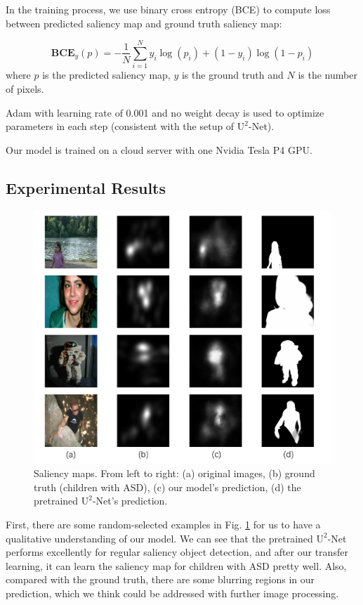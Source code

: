 \documentclass[journal]{IEEEtran}
\begin{document}
In the training process, we use binary cross entropy (BCE) to compute loss between predicted saliency map and ground truth saliency map:

\begin{equation}
    \textbf{BCE}_y(p) = -\frac{1}{N}\sum_{i=1}^{N}y_i\log(p_i) + (1 - y_i)\log(1 - p_i)
\end{equation}
where $p$ is the predicted saliency map, $y$ is the ground truth and $N$ is the number of pixels.

Adam \cite{kingma2014adam} with learning rate of 0.001 and no weight decay is used to optimize parameters in each step (consistent with the setup of $\text{U}^2$-Net). 

Our model is trained on a cloud server with one Nvidia Tesla P4 GPU.

\subsection{Experimental Results}

\begin{figure}
    \centering
    \includegraphics[height=.4\textheight]{examples.png}
    \caption{Saliency maps. From left to right: (a) original images, (b) ground truth (children with ASD), (c) our model's prediction, (d) the pretrained $\text{U}^2$-Net's prediction.}
    \label{fig:examples}
\end{figure}

First, there are some random-selected examples in Fig. \ref{fig:examples} for us to have a qualitative understanding of our model. We can see that the pretrained $\text{U}^2$-Net performs excellently for regular saliency object detection, and after our transfer learning, it can learn the saliency map for children with ASD pretty well. Also, compared with the ground truth, there are some blurring regions in our prediction, which we think could be addressed with further image processing.
\end{document}
